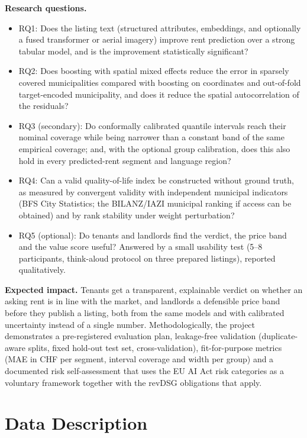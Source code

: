 \documentclass[11pt,a4paper]{article}
\begin{document}
\textbf{Research questions.}
\begin{itemize}
    \item RQ1: Does the listing text (structured attributes, embeddings, and optionally a fused transformer or aerial imagery) improve rent prediction over a strong tabular model, and is the improvement statistically significant?
    \item RQ2: Does boosting with spatial mixed effects reduce the error in sparsely covered municipalities compared with boosting on coordinates and out-of-fold target-encoded municipality, and does it reduce the spatial autocorrelation of the residuals?
    \item RQ3 (secondary): Do conformally calibrated quantile intervals reach their nominal coverage while being narrower than a constant band of the same empirical coverage; and, with the optional group calibration, does this also hold in every predicted-rent segment and language region?
    \item RQ4: Can a valid quality-of-life index be constructed without ground truth, as measured by convergent validity with independent municipal indicators (BFS City Statistics; the BILANZ/IAZI municipal ranking if access can be obtained) and by rank stability under weight perturbation?
    \item RQ5 (optional): Do tenants and landlords find the verdict, the price band and the value score useful? Answered by a small usability test (5--8 participants, think-aloud protocol on three prepared listings), reported qualitatively.
\end{itemize}

\textbf{Expected impact.} Tenants get a transparent, explainable verdict on whether an asking rent is in line with the market, and landlords a defensible price band before they publish a listing, both from the same models and with calibrated uncertainty instead of a single number. Methodologically, the project demonstrates a pre-registered evaluation plan, leakage-free validation (duplicate-aware splits, fixed hold-out test set, cross-validation), fit-for-purpose metrics (MAE in CHF per segment, interval coverage and width per group) and a documented risk self-assessment that uses the EU AI Act risk categories as a voluntary framework together with the revDSG obligations that apply.

\section{Data Description}
\end{document}
